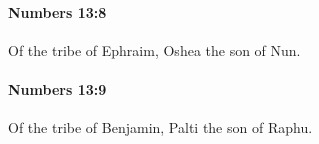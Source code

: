 		\paragraph{Numbers 13:8} %
			\label{NUMBERS-13-8}

			Of the tribe of Ephraim, Oshea the son of Nun.


		\paragraph{Numbers 13:9} %
			\label{NUMBERS-13-9}

			Of the tribe of Benjamin, Palti the son of Raphu.


